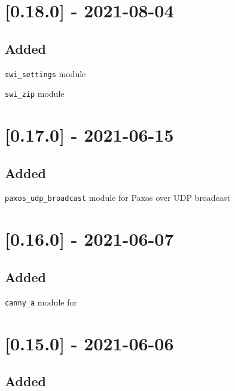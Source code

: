 \section{[0.18.0] - 2021-08-04}

\subsection{Added}

\begin{shortlist}
    \item \verb$swi_settings$ module
    \item \verb$swi_zip$ module
\end{shortlist}

\section{[0.17.0] - 2021-06-15}

\subsection{Added}

\begin{shortlist}
    \item \verb$paxos_udp_broadcast$ module for Paxos over UDP broadcast
\end{shortlist}

\section{[0.16.0] - 2021-06-07}

\subsection{Added}

\begin{shortlist}
    \item \verb$canny_a$ module for 
\end{shortlist}

\section{[0.15.0] - 2021-06-06}

\subsection{Added}

